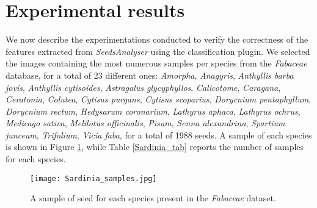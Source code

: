 \section{Experimental results} 
We now describe the experimentations conducted to verify the correctness of the features extracted from \emph{SeedsAnalyser} using the classification plugin.
We selected the images containing the most numerous samples per species from the \emph{Fabaceae} database, for a total of 23 different ones: 
\emph{Amorpha}, \emph{Anagyris}, \emph{Anthyllis barba jovis}, \emph{Anthyllis cytisoides}, \emph{Astragalus glycyphyllos}, \emph{Calicotome}, \emph{Caragana}, \emph{Ceratonia}, \emph{Colutea}, \emph{Cytisus purgans}, \emph{Cytisus scoparius}, \emph{Dorycnium pentaphyllum}, \emph{Dorycnium rectum}, \emph{Hedysarum coronarium}, \emph{Lathyrus aphaca}, \emph{Lathyrus ochrus}, \emph{Medicago sativa}, \emph{Melilotus officinalis}, \emph{Pisum}, \emph{Senna alexandrina}, \emph{Spartium junceum}, \emph{Trifolium}, \emph{Vicia faba}, for a total of 1988 seeds.
A sample of each species is shown in Figure \ref{Sardinia_samples}, while Table \ref{Sardinia_tab} reports the number of samples for each species.

\begin{figure}[htbp]
	\centering
	\texttt{[image: Sardinia\_samples.jpg]}
	\caption{A sample of seed for each species present in the \emph{Fabaceae} dataset.}
	\label{Sardinia_samples}
\end{figure}

